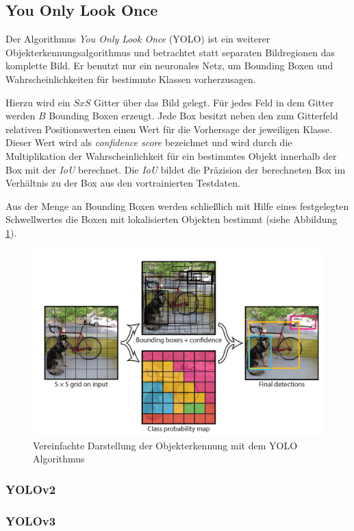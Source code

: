 \subsection{You Only Look Once}

Der Algorithmus \textit{You Only Look Once} (YOLO) ist ein weiterer Objekterkennungsalgorithmus und betrachtet statt separaten Bildregionen das komplette Bild. Er benutzt nur ein neuronales Netz, um Bounding Boxen und Wahrscheinlichkeiten für bestimmte Klassen vorherzusagen.

Hierzu wird ein $S x S$ Gitter über das Bild gelegt. Für jedes Feld in dem Gitter werden $B$ Bounding Boxen erzeugt. Jede Box besitzt neben den zum Gitterfeld relativen Positionswerten einen Wert für die Vorhersage der jeweiligen Klasse. Dieser Wert wird als \textit{confidence score} bezeichnet und wird durch die Multiplikation der Wahrscheinlichkeit für ein bestimmtes Objekt innerhalb der Box mit der \textit{IoU} berechnet. Die \textit{IoU} bildet die Präzision der berechneten Box im Verhältnis zu der Box aus den vortrainierten Testdaten. \cite[S. 2]{JosephRedmon.2016} 

Aus der Menge an Bounding Boxen werden schließlich mit Hilfe eines festgelegten Schwellwertes die Boxen mit lokalisierten Objekten bestimmt (siehe Abbildung \ref{yolo_model}).

\begin{figure}[ht]
	\begin{center}
		\includegraphics[width=15cm]{Bilder/yolo_model.png} 
		\caption[Vereinfachte Darstellung der Objekterkennung mit dem YOLO Algorithmus]{Vereinfachte Darstellung der Objekterkennung mit dem YOLO Algorithmus \cite[S. 2]{JosephRedmon.2016}}
		\label{yolo_model}
	\end{center}
\end{figure}

\subsubsection{YOLOv2}

\subsubsection{YOLOv3}




